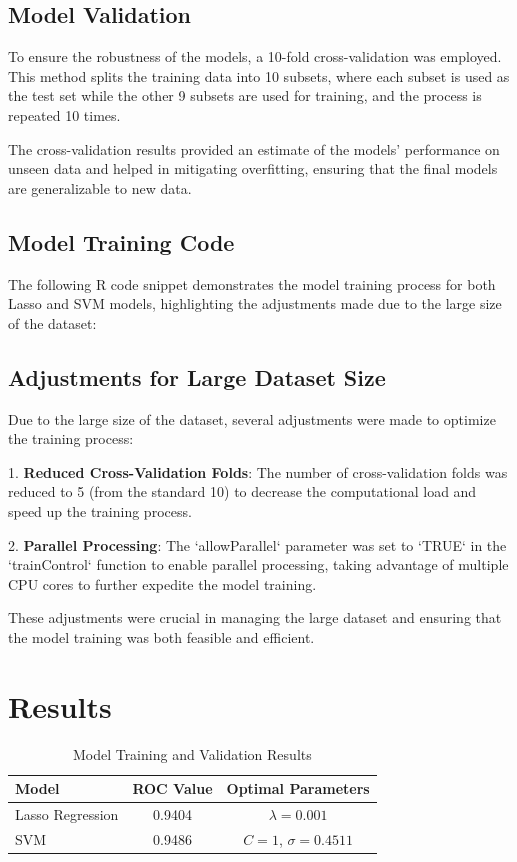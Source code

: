 \documentclass[12pt]{article}
\begin{document}
\subsection{Model Validation}
To ensure the robustness of the models, a 10-fold cross-validation was employed. This method splits the training data into 10 subsets, where each subset is used as the test set while the other 9 subsets are used for training, and the process is repeated 10 times.

The cross-validation results provided an estimate of the models' performance on unseen data and helped in mitigating overfitting, ensuring that the final models are generalizable to new data.


\subsection{Model Training Code}
The following R code snippet demonstrates the model training process for both Lasso and SVM models, highlighting the adjustments made due to the large size of the dataset:




\subsection{Adjustments for Large Dataset Size}
Due to the large size of the dataset, several adjustments were made to optimize the training process:

1. \textbf{Reduced Cross-Validation Folds}: The number of cross-validation folds was reduced to 5 (from the standard 10) to decrease the computational load and speed up the training process.

2. \textbf{Parallel Processing}: The `allowParallel` parameter was set to `TRUE` in the `trainControl` function to enable parallel processing, taking advantage of multiple CPU cores to further expedite the model training.

These adjustments were crucial in managing the large dataset and ensuring that the model training was both feasible and efficient.

\section{Results}
\label{sec:resu}

\begin{table}[ht]
	\centering
	\caption{Model Training and Validation Results}
	\label{table:training_results}
	\begin{tabular}{lcc}
		\hline
		\textbf{Model} & \textbf{ROC Value} & \textbf{Optimal Parameters} \\
		\hline
		Lasso Regression & 0.9404 & $\lambda = 0.001$ \\
		SVM & 0.9486 & $C = 1$, $\sigma = 0.4511$ \\
		\hline
	\end{tabular}
\end{table}
\end{document}
